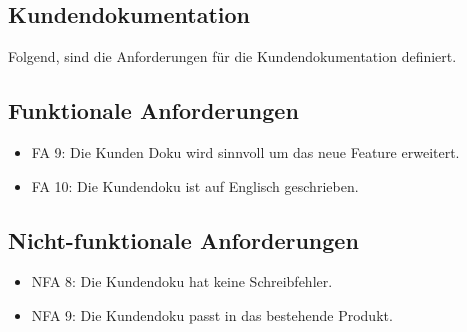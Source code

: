 \subsection{Kundendokumentation}

Folgend, sind die Anforderungen für die Kundendokumentation definiert.

\subsection*{Funktionale Anforderungen}
\begin{itemize}
	\item FA 9: Die Kunden Doku wird sinnvoll um das neue Feature erweitert.
	\item FA 10: Die Kundendoku ist auf Englisch geschrieben.
\end{itemize}

\subsection*{Nicht-funktionale Anforderungen}
\begin{itemize}
	\item NFA 8: Die Kundendoku hat keine Schreibfehler. 
	\item NFA 9: Die Kundendoku passt in das bestehende Produkt.
\end{itemize}